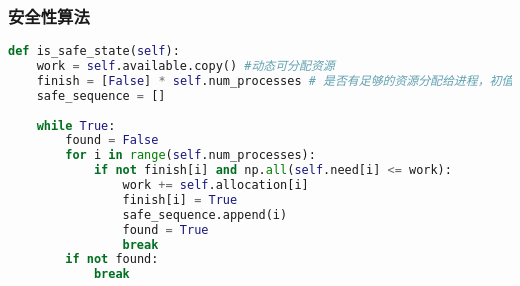 \documentclass[12pt, a4paper, oneside]{ctexart}
\begin{document}
\begin{table}[H]
    \centering
    \renewcommand{\arraystretch}{1.5} %
    \setlength{\tabcolsep}{4pt} %

\end{table}

\subsubsection{安全性算法}

\begin{lstlisting}[language=Python, caption=安全性算法代码]
def is_safe_state(self):
    work = self.available.copy() #动态可分配资源
    finish = [False] * self.num_processes # 是否有足够的资源分配给进程，初值为 false
    safe_sequence = []
    
    while True:
        found = False
        for i in range(self.num_processes):
            if not finish[i] and np.all(self.need[i] <= work):
                work += self.allocation[i]
                finish[i] = True
                safe_sequence.append(i)
                found = True
                break
        if not found:
            break
\end{lstlisting}
\end{document}
